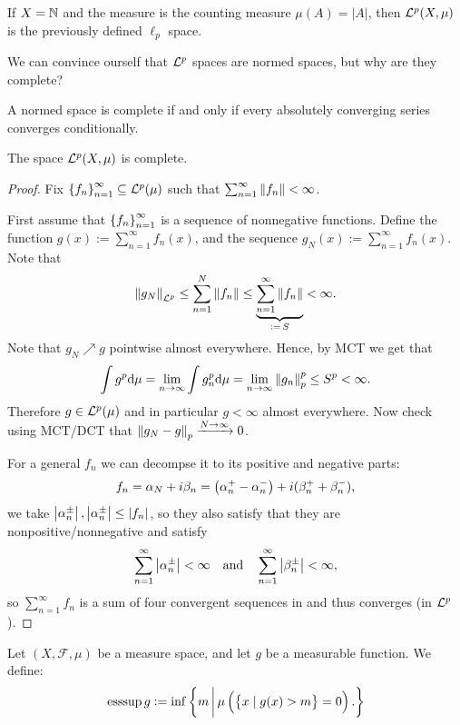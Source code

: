 \documentclass[11pt,a4paper]{article}
\begin{document}
\begin{remark}
  If $X = \mathbb{N}$ and the measure is the counting measure $\mu(A) = |A|$,
  then $\mathcal{L}^p(X,\mu)$ is the previously defined $\ell_p$ space.
\end{remark}

\begin{question}
  We can convince ourself that $\mathcal{L}^p$ spaces are normed spaces,
  but why are they complete?
\end{question}

\begin{exercise}
  A normed space is complete if and only if every absolutely converging
  series converges conditionally.
\end{exercise}

\begin{theorem}
  The space $\mathcal{L}^p(X,\mu)$ is complete.
\end{theorem}
\begin{proof}
  Fix $\left\{f_n\right\}_{n=1}^{\infty} \subseteq \mathcal{L}^p(\mu)$ such that
  $\sum_{n=1}^{\infty} \left\lVert f_n\right\rVert < \infty$.

  First assume that $\left\{f_n\right\}_{n=1}^{\infty}$
  is a sequence of nonnegative functions.
  Define the function $g(x) := \sum_{n=1}^{\infty} f_n(x)$,
  and the sequence $g_N(x) := \sum_{n=1}^{\infty} f_n(x)$.
  Note that
  \[
    \left\lVert g_N\right\rVert_{\mathcal{L}^p} \le
    \sum_{n=1}^{N} \left\lVert f_n\right\rVert \le
    \underbrace{\sum_{n=1}^{\infty} \left\lVert f_n\right\rVert}_{:=\, S} < \infty.
  \]
  Note that $g_N \nearrow g$ pointwise almost everywhere.
  Hence, by MCT we get that
  \[
    \int g^p \mathrm{d} \mu =
    \lim_{n \to \infty} \int g_n^p \mathrm{d} \mu =
    \lim_{n \to \infty} \left\lVert g_n\right\rVert_p^p \le
    S^p < \infty.
  \]
  Therefore $g \in \mathcal{L}^p(\mu)$ and in particular $g < \infty$
  almost everywhere.
  Now check using MCT/DCT that $\left\lVert g_N - g\right\rVert_p \xrightarrow{N \to \infty} 0$.

  For a general $f_n$ we can decompse it to its positive and negative
  parts:
  \[
    f_n = \alpha_N + i \beta_n =
    \del{\alpha_n^+ - \alpha_n^-} + i(\beta_n^+ + \beta_n^-),
  \]
  we take $\left\lvert\alpha_n^{\pm}\right\rvert,\left\lvert\alpha_n^{\pm}\right\rvert \le \left\lvert f_n\right\rvert$,
  so they also satisfy that they are nonpositive/nonnegative
  and satisfy
  \[
    \sum_{n=1}^{\infty} \left\lvert\alpha_n^{\pm}\right\rvert < \infty
    \quad \text{and} \quad
    \sum_{n=1}^{\infty} \left\lvert\beta_n^{\pm}\right\rvert < \infty,
  \]
  so $\sum_{n=1}^{\infty} f_n$ is a sum of four convergent sequences in
  and thus converges (in $\mathcal{L}^p$).
\end{proof}

\begin{definition}
  Let $(X,\mathcal F,\mu)$ be a measure space,
  and let $g$ be a measurable function.
  We define:
  \[
    \esssup g := \inf \set{m \,\middle\vert\, \mu\del{\set{x \mid g(x) > m} = 0}.}
  \]
\end{definition}
\end{document}
